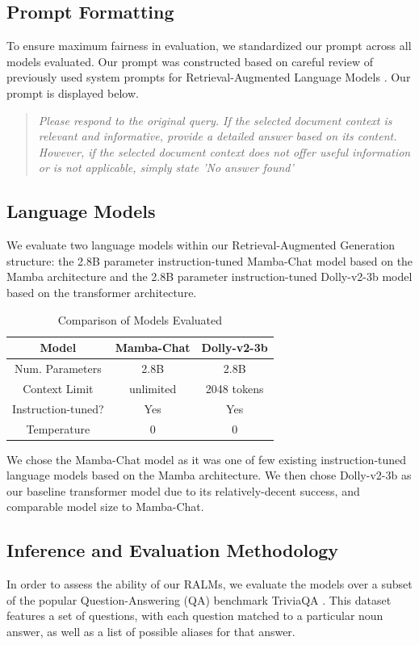 \documentclass[11pt]{article}
\begin{document}
\subsection{Prompt Formatting}
To ensure maximum fairness in evaluation, we standardized our prompt across all models evaluated. Our prompt was constructed based on careful review of previously used system prompts for Retrieval-Augmented Language Models \cite{ralm_prompt}.
\newline
\newline
Our prompt is displayed below.
\begin{quote}
    \textit{Please respond to the original query. If the selected document context is relevant and informative, provide a detailed answer based on its content. However, if the selected document context does not offer useful information or is not applicable, simply state 'No answer found'}
\end{quote}
\subsection{Language Models}
We evaluate two language models within our Retrieval-Augmented Generation structure: the 2.8B parameter instruction-tuned Mamba-Chat model based on the Mamba architecture and the 2.8B parameter instruction-tuned Dolly-v2-3b model based on the transformer architecture.
\begin{table}[t]
    \centering
    \begin{tabular}{|c|c|c|} 
     \hline
     \textbf{Model} & Mamba-Chat & Dolly-v2-3b \\
     \hline\hline
     Num. Parameters & 2.8B & 2.8B \\ 
     \hline
     Context Limit & unlimited & 2048 tokens \\
     \hline
     Instruction-tuned? & Yes & Yes \\
     \hline
     Temperature & 0 & 0 \\
     \hline
    \end{tabular}
    \caption{Comparison of Models Evaluated}
    \label{tab:my_label}
\end{table}

We chose the Mamba-Chat model \cite{haven2023mambachat} as it was one of few existing instruction-tuned language models based on the Mamba architecture. We then chose Dolly-v2-3b \cite{DatabricksBlog2023DollyV2} as our baseline transformer model due to its relatively-decent success, and comparable model size to Mamba-Chat. 
\subsection{Inference and Evaluation Methodology}
In order to assess the ability of our RALMs, we evaluate the models over a subset of the popular Question-Answering (QA) benchmark TriviaQA \cite{Joshi2017TriviaQAAL}. This dataset features a set of questions, with each question matched to a particular noun answer, as well as a list of possible aliases for that answer.
\end{document}

